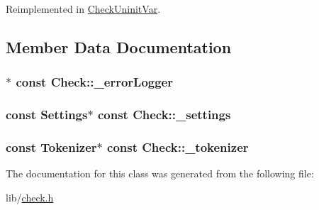 Reimplemented in \hyperlink{class_check_uninit_var_af8b793f3e2fec75185e7b5be9ada3a8b}{Check\-Uninit\-Var}.



\subsection{Member Data Documentation}
\hypertarget{class_check_a450670ccdb74fcb182d06c82cf3a6359}{
\subsubsection[{\-\_\-error\-Logger}]{$\ast$ const Check\-::\-\_\-error\-Logger\hspace{0.3cm}{\ttfamily [protected]}}}\label{class_check_a450670ccdb74fcb182d06c82cf3a6359}
\hypertarget{class_check_a3c1811565f8eff303d84fb797baf9bf9}{
\subsubsection[{\-\_\-settings}]{\setlength{\rightskip}{0pt plus 5cm}const {\bf Settings}$\ast$ const Check\-::\-\_\-settings\hspace{0.3cm}{\ttfamily [protected]}}}\label{class_check_a3c1811565f8eff303d84fb797baf9bf9}
\hypertarget{class_check_af177003f600a2f1a22c48b9fd2c4d579}{
\subsubsection[{\-\_\-tokenizer}]{\setlength{\rightskip}{0pt plus 5cm}const {\bf Tokenizer}$\ast$ const Check\-::\-\_\-tokenizer\hspace{0.3cm}{\ttfamily [protected]}}}\label{class_check_af177003f600a2f1a22c48b9fd2c4d579}


The documentation for this class was generated from the following file\-:\begin{DoxyCompactItemize}
\item 
lib/\hyperlink{check_8h}{check.\-h}\end{DoxyCompactItemize}
